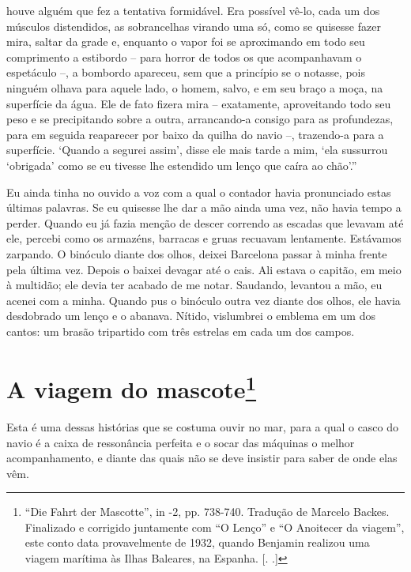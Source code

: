 houve alguém que fez a tentativa formidável. Era possível vê-lo, cada um
dos músculos distendidos, as sobrancelhas virando uma só, como se
quisesse fazer mira, saltar da grade e, enquanto o vapor foi se
aproximando em todo seu comprimento a estibordo -- para horror de todos
os que acompanhavam o espetáculo --, a bombordo apareceu, sem que a
princípio se o notasse, pois ninguém olhava para aquele lado, o homem,
salvo, e em seu braço a moça, na superfície da água. Ele de fato fizera
mira -- exatamente, aproveitando todo seu peso e se precipitando sobre a
outra, arrancando-a consigo para as profundezas, para em seguida
reaparecer por baixo da quilha do navio --, trazendo-a para a
superfície. `Quando a segurei assim', disse ele mais tarde a mim, `ela
sussurrou `obrigada' como se eu tivesse lhe estendido um lenço que caíra
ao chão'.''\label{supra9}

Eu ainda tinha no ouvido a voz com a qual o contador havia pronunciado
estas últimas palavras. Se eu quisesse lhe dar a mão ainda uma vez, não
havia tempo a perder. Quando eu já fazia menção de descer correndo as
escadas que levavam até ele, percebi como os armazéns, barracas e gruas
recuavam lentamente. Estávamos zarpando. O binóculo diante dos olhos,
deixei Barcelona passar à minha frente pela última vez. Depois o baixei
devagar até o cais. Ali estava o capitão, em meio à multidão; ele devia
ter acabado de me notar. Saudando, levantou a mão, eu acenei com a
minha. Quando pus o binóculo outra vez diante dos olhos, ele havia
desdobrado um lenço e o abanava. Nítido, vislumbrei o emblema em um dos
cantos: um brasão tripartido com três estrelas em cada um dos campos.

\chapter{A viagem do mascote\footnote[*]{``Die Fahrt der Mascotte'', in  -2, pp.
  738-740. Tradução de Marcelo Backes. Finalizado e corrigido juntamente
  com ``O Lenço'' e ``O Anoitecer da viagem'', este conto data
  provavelmente de 1932, quando Benjamin realizou uma viagem marítima às
  Ilhas Baleares, na Espanha. [. .]} }

Esta é uma dessas histórias que se costuma ouvir no mar, para a qual o
casco do navio é a caixa de ressonância perfeita e o socar das máquinas
o melhor acompanhamento, e diante das quais não se deve insistir para
saber de onde elas vêm.

